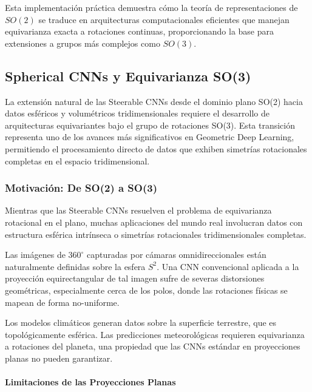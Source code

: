 Esta implementación práctica demuestra cómo la teoría de representaciones de $SO(2)$ se traduce en arquitecturas computacionales eficientes que manejan equivarianza exacta a rotaciones continuas, proporcionando la base para extensiones a grupos más complejos como $SO(3)$.

\subsection{Spherical CNNs y Equivarianza SO(3)}\label{subsec:spherical_cnns_so3}

La extensión natural de las Steerable CNNs desde el dominio plano SO(2) hacia datos esféricos y volumétricos tridimensionales requiere el desarrollo de arquitecturas equivariantes bajo el grupo de rotaciones SO(3). Esta transición representa uno de los avances más significativos en Geometric Deep Learning, permitiendo el procesamiento directo de datos que exhiben simetrías rotacionales completas en el espacio tridimensional.

\subsubsection{Motivación: De SO(2) a SO(3)}

Mientras que las Steerable CNNs resuelven el problema de equivarianza rotacional en el plano, muchas aplicaciones del mundo real involucran datos con estructura esférica intrínseca o simetrías rotacionales tridimensionales completas.

\begin{example}
Las imágenes de $360^\circ$ capturadas por cámaras omnidireccionales están naturalmente definidas sobre la esfera $S^2$. Una CNN convencional aplicada a la proyección equirectangular de tal imagen sufre de severas distorsiones geométricas, especialmente cerca de los polos, donde las rotaciones físicas se mapean de forma no-uniforme.
\end{example}

\begin{example}
Los modelos climáticos generan datos sobre la superficie terrestre, que es topológicamente esférica. Las predicciones meteorológicas requieren equivarianza a rotaciones del planeta, una propiedad que las CNNs estándar en proyecciones planas no pueden garantizar.
\end{example}

\paragraph{Limitaciones de las Proyecciones Planas}

